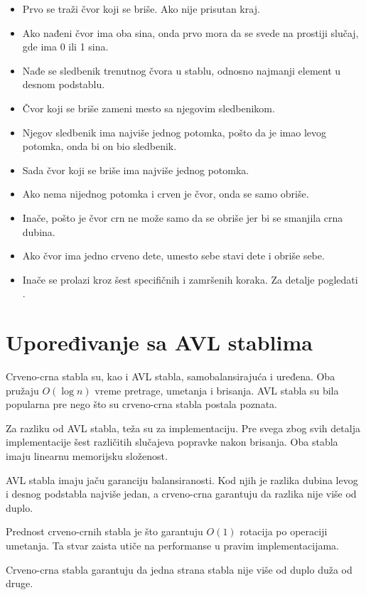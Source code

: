 \documentclass[a4paper]{article}
\begin{document}
\begin{itemize}
    \item Prvo se traži čvor koji se briše. Ako nije prisutan kraj.
    \item Ako nađeni čvor ima oba sina, onda prvo mora da se svede na prostiji slučaj, gde ima 0 ili 1 sina.
    \item Nađe se sledbenik trenutnog čvora u stablu, odnosno najmanji element u desnom podstablu.
    \item Čvor koji se briše zameni mesto sa njegovim sledbenikom.
    \item Njegov sledbenik ima najviše jednog potomka, pošto da je imao levog potomka, onda bi on bio sledbenik.
    \item Sada čvor koji se briše ima najviše jednog potomka. 
    \item Ako nema nijednog potomka i crven je čvor, onda se samo obriše.
    \item Inače, pošto je čvor crn ne može samo da se obriše jer bi se smanjila crna dubina.
    \item Ako čvor ima jedno crveno dete, umesto sebe stavi dete i obriše sebe.
    \item Inače se prolazi kroz šest specifičnih i zamršenih koraka. Za detalje pogledati \cite{cases} \cite{clrs}.
\end{itemize}


\section{Upoređivanje sa AVL stablima}
    Crveno-crna stabla su, kao i AVL stabla, samobalansirajuća i uređena. Oba pružaju $O(\log n)$ vreme pretrage, umetanja i brisanja.
    AVL stabla su bila popularna pre nego što su crveno-crna stabla postala poznata.

    Za razliku od AVL stabla, teža su za implementaciju. Pre svega zbog svih detalja implementacije šest različitih slučajeva 
    popravke nakon brisanja.
    Oba stabla imaju linearnu memorijsku složenost.

    AVL stabla imaju jaču garanciju balansiranosti. Kod njih je razlika dubina levog i desnog podstabla najviše jedan, a crveno-crna garantuju da razlika nije više od duplo.

    Prednost crveno-crnih stabla je što garantuju $O(1)$ rotacija po operaciji umetanja. 
    Ta stvar zaista utiče na performanse u pravim implementacijama.

    Crveno-crna stabla garantuju da jedna strana stabla nije više od duplo duža od druge.
\end{document}
